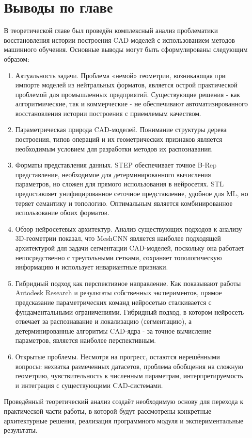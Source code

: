 
\section{Выводы по главе}

В теоретической главе был проведён комплексный анализ проблематики восстановления истории построения CAD-моделей с использованием методов машинного обучения. Основные выводы могут быть сформулированы следующим образом:

\begin{enumerate}
\item Актуальность задачи. Проблема «немой» геометрии, возникающая при импорте моделей из нейтральных форматов, является острой практической проблемой для промышленных предприятий. Существующие решения - как алгоритмические, так и коммерческие - не обеспечивают автоматизированного восстановления истории построения с приемлемым качеством.

\item Параметрическая природа CAD-моделей. Понимание структуры дерева построения, типов операций и их геометрических признаков является необходимым условием для разработки методов их распознавания.

\item Форматы представления данных. STEP обеспечивает точное B-Rep представление, необходимое для детерминированного вычисления параметров, но сложен для прямого использования в нейросетях. STL предоставляет унифицированное сеточное представление, удобное для ML, но теряет семантику и топологию. Оптимальным является комбинированное использование обоих форматов.

\item Обзор нейросетевых архитектур. Анализ существующих подходов к анализу 3D-геометрии показал, что MeshCNN является наиболее подходящей архитектурой для задачи сегментации CAD-моделей, поскольку она работает непосредственно с треугольными сетками, сохраняет топологическую информацию и использует инвариантные признаки.

\item Гибридный подход как перспективное направление. Как показывают работы Autodesk Research и результаты собственных экспериментов, прямое предсказание параметрических команд нейросетью сталкивается с фундаментальными ограничениями. Гибридный подход, в котором нейросеть отвечает за распознавание и локализацию (сегментацию), а детерминированные алгоритмы CAD-ядра - за точное вычисление параметров, является наиболее перспективным.

\item Открытые проблемы. Несмотря на прогресс, остаются нерешёнными вопросы: нехватка размеченных датасетов, проблема обобщения на сложную геометрию, чувствительность к численным параметрам, интерпретируемость и интеграция с существующими CAD-системами.
\end{enumerate}

Проведённый теоретический анализ создаёт необходимую основу для перехода к практической части работы, в которой будут рассмотрены конкретные архитектурные решения, реализация программного модуля и экспериментальные результаты.

